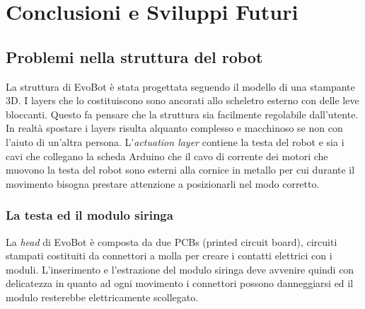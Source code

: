 \chapter{Conclusioni e Sviluppi Futuri}
\vspace{0.5cm}
\label{cha:789}

\section{Problemi nella struttura del robot}
\label{sec:456}
La struttura di EvoBot è stata progettata seguendo il modello di una stampante 3D. I layers che lo costituiscono sono ancorati allo scheletro esterno con delle leve bloccanti. Questo fa pensare che la struttura sia facilmente regolabile dall'utente. In realtà spostare i layers risulta alquanto complesso e macchinoso se non con l'aiuto di un'altra persona. L'\emph{actuation layer} contiene la testa del robot e sia i cavi che collegano la scheda Arduino che il cavo di corrente dei motori che muovono la testa del robot sono esterni alla cornice in metallo per cui durante il movimento bisogna prestare attenzione a posizionarli nel modo corretto.

\subsection{La testa ed il modulo siringa}
La \emph{head} di EvoBot è composta da due PCBs (printed circuit board), circuiti stampati costituiti da connettori a molla per creare i contatti elettrici con i moduli. L'inserimento e l'estrazione del modulo siringa deve avvenire quindi con delicatezza in quanto ad ogni movimento i connettori possono danneggiarsi ed il modulo resterebbe elettricamente scollegato.

